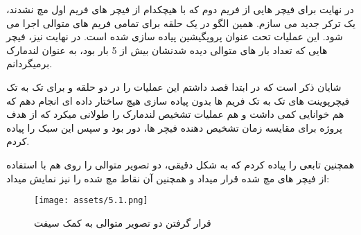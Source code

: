 \documentclass[a4paper,12pt]{article}
\begin{document}
در نهایت برای فیچر هایی از فریم دوم که با هیچکدام از فیچر های فریم اول مچ نشدند، یک ترکر جدید می سازم. همین الگو در یک حلقه برای تمامی فریم های متوالی اجرا می شود. این عملیات تحت عنوان پروپگیشین پیاده سازی شده است.
در نهایت نیز، فیچر هایی که تعداد بار های متوالی دیده شدنشان بیش از 5 بار بود، به عنوان لندمارک برمیگردانم.

شایان ذکر است که در ابتدا قصد داشتم این عملیات را در دو حلقه و برای تک به تک فیچرپوینت های تک به تک فریم ها بدون پیاده سازی هیچ ساختار داده ای انجام دهم که هم خوانایی کمی داشت و هم عملیات تشخیص لندمارک را طولانی میکرد که از هدف پروژه برای مقایسه زمان تشخیص دهنده فیچر ها، دور بود و سپس این سبک را پیاده کردم.

همچنین تابعی را پیاده کردم که به شکل دقیقی، دو تصویر متوالی را روی هم با استفاده از فیچر های مچ شده قرار میداد و همچنین آن نقاط مچ شده را نیز نمایش میداد:


 \begin{figure}[h]
	\centering
	\texttt{[image: assets/5.1.png]}
	\caption{\textcolor{CustomAccent}{قرار گرفتن دو تصویر متوالی به کمک سیفت}}
\end{figure}
\end{document}

